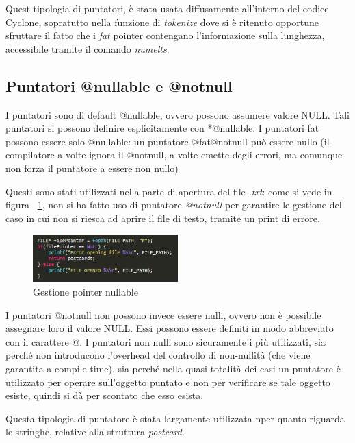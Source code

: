 Quest tipologia di puntatori, è stata usata diffusamente all'interno del codice Cyclone, sopratutto nella funzione di \textit{tokenize} dove si è ritenuto opportune sfruttare il fatto che i \textit{fat} pointer contengano l'informazione sulla lunghezza, accessibile tramite il comando \textit{numelts}.

\subsection{Puntatori @nullable e @notnull}
I puntatori sono di default @nullable, ovvero possono assumere valore NULL. Tali puntatori
si possono definire esplicitamente con *@nullable. I puntatori fat possono essere solo
@nullable: un puntatore @fat@notnull può essere nullo (il compilatore a volte ignora il
@notnull, a volte emette degli errori, ma comunque non forza il puntatore a essere non
nullo)

Questi sono stati utilizzati nella parte di apertura del file \textit{.txt}: come si vede in figura ~\ref{fig:nullable}, non si ha fatto uso di puntatore \textit{@notnull} per garantire le gestione del caso in cui non si riesca ad aprire il file di testo, tramite un print di errore.

\begin{figure}[h]
	\centering
	\includegraphics[width=0.5\textwidth]{Immagini/NullablePointerFile.png}
	\caption{Gestione pointer nullable}
	\label{fig:nullable}
\end{figure}

I puntatori @notnull non possono invece essere nulli, ovvero non è possibile assegnare loro il
valore NULL. Essi possono essere definiti in modo abbreviato con il carattere @.
I puntatori non nulli sono sicuramente i più utilizzati, sia perché non introducono l’overhead
del controllo di non-nullità (che viene garantita a compile-time), sia perché nella quasi totalità
dei casi un puntatore è utilizzato per operare sull’oggetto puntato e non per verificare se tale
oggetto esiste, quindi si dà per scontato che esso esista.

Questa tipologia di puntatore è stata largamente utilizzata nper quanto riguarda le stringhe, relative alla struttura \textit{postcard}.

